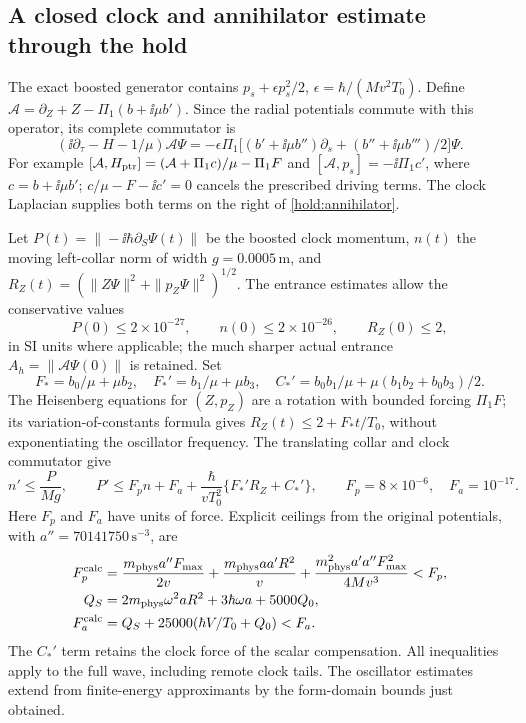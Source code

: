 \documentclass[11pt]{article}
\theoremstyle{definition}\newtheorem{definition}[theorem]{Definition}
\theoremstyle{remark}\newtheorem{remark}[theorem]{Remark}
\begin{document}
\subsection{A closed clock and annihilator estimate through the hold}
\label{hold:clock}
The exact boosted generator contains $p_s+\epsilon p_s^2/2$,
$\epsilon=\hbar/(Mv^2T_0)$.  Define
$\mathcal A=\partial_Z+Z-\Pi_1(b+\ii\mu b')$.
Since the radial potentials commute with this operator, its complete
commutator is
\begin{equation}\label{hold:annihilator}
 (\ii\partial_\tau-H-1/\mu)\mathcal A\Psi
 =-\epsilon\Pi_1\bigl[(b'+\ii\mu b'')\partial_s
                          +(b''+\ii\mu b''')/2\bigr]\Psi.
\end{equation}
For example $[\mathcal A,H_{\rm ptr}]=(\mathcal A+\Pi_1c)/\mu
-\Pi_1F$ and $[\mathcal A,p_s]=-\ii\Pi_1c'$, where
$c=b+\ii\mu b'$; $c/\mu-F-\ii c'=0$ cancels the prescribed
driving terms.  The clock Laplacian supplies both terms on the right
of \eqref{hold:annihilator}.

Let $P(t)=\|-\ii\hbar\partial_S\Psi(t)\|$ be the boosted clock
momentum, $n(t)$ the moving left-collar norm of width
$g=0.0005\,\mathrm m$, and
$R_Z(t)=(\|Z\Psi\|^2+\|p_Z\Psi\|^2)^{1/2}$.
The entrance estimates allow the conservative values
\[
 P(0)\leq2\times10^{-27},\qquad n(0)\leq2\times10^{-26},
 \qquad R_Z(0)\leq2,
\]
in SI units where applicable; the much sharper actual entrance
$A_h=\|\mathcal A\Psi(0)\|$ is retained.
Set
\[
 F_*={b_0}/{\mu}+\mu b_2,\quad
 F_*'={b_1}/{\mu}+\mu b_3,\quad
 C_*'={b_0b_1}/{\mu}+\mu(b_1b_2+b_0b_3)/2.
\]
The Heisenberg equations for $(Z,p_Z)$ are a rotation with bounded
forcing $\Pi_1F$; its variation-of-constants formula gives
$R_Z(t)\leq2+F_*t/T_0$, without exponentiating the oscillator
frequency.  The translating collar and clock commutator give
\begin{equation}\label{hold:closedmoments}
 n'\leq\frac{P}{Mg},\qquad
 P'\leq F_p n+F_a+
       \frac{\hbar}{vT_0^2}\{F_*'R_Z+C_*'\},
 \qquad F_p=8\times10^{-6},\quad F_a=10^{-17}.
\end{equation}
Here $F_p$ and $F_a$ have units of force.  Explicit ceilings from
the original potentials, with $a''=70141750\,\mathrm{s}^{-3}$, are
\begin{align*}
 F_p^{\rm calc}&=
 \frac{m_{\rm phys}a''F_{\max}}{2v}
 +\frac{m_{\rm phys}aa'R^2}{v}
 +\frac{m_{\rm phys}^2a'a''F_{\max}^2}{4Mv^3}<F_p,\\
 Q_S&=2m_{\rm phys}\omega^2aR^2+3\hbar\omega a+5000Q_0,\\
 F_a^{\rm calc}&=Q_S+25000(\hbar V/T_0+Q_0)<F_a.
\end{align*}
The $C_*'$ term retains the clock force of the scalar compensation.
All inequalities apply to the full wave, including remote clock tails.
The oscillator estimates extend from finite-energy approximants by
the form-domain bounds just obtained.
\end{document}
